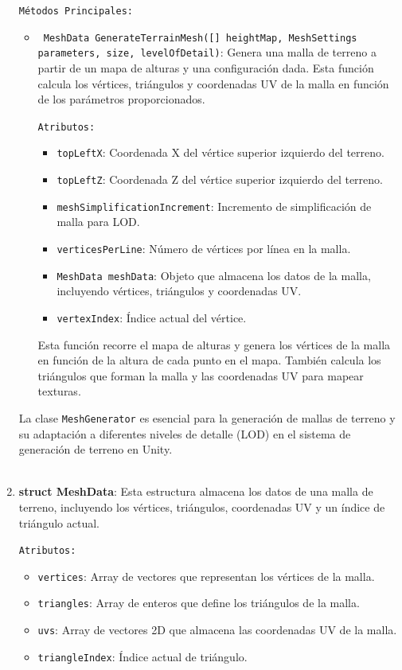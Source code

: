 \begin{enumerate}
    \texttt{Métodos Principales:}

    \begin{itemize}
        \item \texttt{ MeshData GenerateTerrainMesh([] heightMap, MeshSettings parameters,  size,  levelOfDetail)}: Genera una malla de terreno a partir de un mapa de alturas y una configuración dada. Esta función calcula los vértices, triángulos y coordenadas UV de la malla en función de los parámetros proporcionados.

        \texttt{Atributos:}

        \begin{itemize}
            \item \texttt{topLeftX}: Coordenada X del vértice superior izquierdo del terreno.
            \item \texttt{topLeftZ}: Coordenada Z del vértice superior izquierdo del terreno.
            \item \texttt{meshSimplificationIncrement}: Incremento de simplificación de malla para LOD.
            \item \texttt{verticesPerLine}: Número de vértices por línea en la malla.
            \item \texttt{MeshData meshData}: Objeto que almacena los datos de la malla, incluyendo vértices, triángulos y coordenadas UV.
            \item \texttt{vertexIndex}: Índice actual del vértice.
        \end{itemize}

        Esta función recorre el mapa de alturas y genera los vértices de la malla en función de la altura de cada punto en el mapa. También calcula los triángulos que forman la malla y las coordenadas UV para mapear texturas.
    \end{itemize}

    La clase \texttt{MeshGenerator} es esencial para la generación de mallas de terreno y su adaptación a diferentes niveles de detalle (LOD) en el sistema de generación de terreno en Unity.\\
    \\

    \item \textbf{struct MeshData}: Esta estructura almacena los datos de una malla de terreno, incluyendo los vértices, triángulos, coordenadas UV y un índice de triángulo actual.

    \texttt{Atributos:}

    \begin{itemize}
        \item \texttt{vertices}: Array de vectores que representan los vértices de la malla.
        \item \texttt{triangles}: Array de enteros que define los triángulos de la malla.
        \item \texttt{uvs}: Array de vectores 2D que almacena las coordenadas UV de la malla.
        \item \texttt{triangleIndex}: Índice actual de triángulo.
    \end{itemize}


\end{enumerate}
